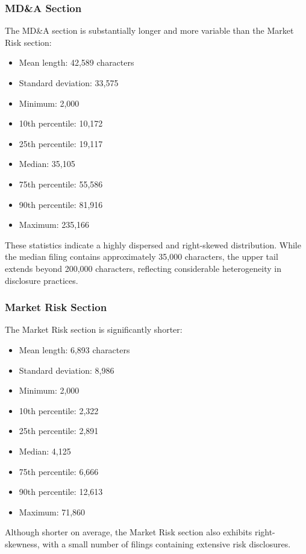 \subsubsection*{MD\&A Section}

The MD\&A section is substantially longer and more variable than the Market Risk section:

\begin{itemize}
    \item Mean length: 42,589 characters
    \item Standard deviation: 33,575
    \item Minimum: 2,000
    \item 10th percentile: 10,172
    \item 25th percentile: 19,117
    \item Median: 35,105
    \item 75th percentile: 55,586
    \item 90th percentile: 81,916
    \item Maximum: 235,166
\end{itemize}

These statistics indicate a highly dispersed and right-skewed distribution. While the median filing contains approximately 35,000 characters, the upper tail extends beyond 200,000 characters, reflecting considerable heterogeneity in disclosure practices.

\subsubsection*{Market Risk Section}

The Market Risk section is significantly shorter:

\begin{itemize}
    \item Mean length: 6,893 characters
    \item Standard deviation: 8,986
    \item Minimum: 2,000
    \item 10th percentile: 2,322
    \item 25th percentile: 2,891
    \item Median: 4,125
    \item 75th percentile: 6,666
    \item 90th percentile: 12,613
    \item Maximum: 71,860
\end{itemize}

Although shorter on average, the Market Risk section also exhibits right-skewness, with a small number of filings containing extensive risk disclosures.

